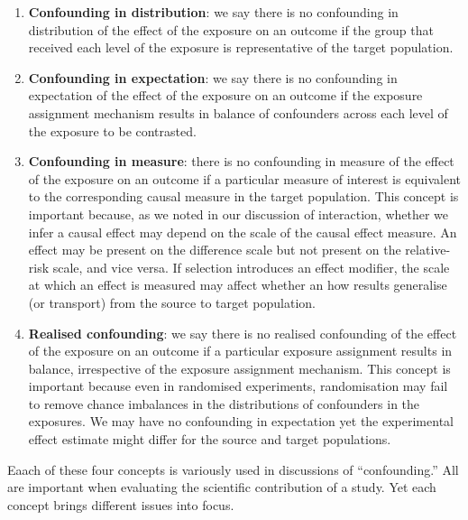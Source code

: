 \documentclass[
  singlecolumn]{report}
\begin{document}
\begin{enumerate}
\def\labelenumi{\arabic{enumi}.}
\item
  \textbf{Confounding in distribution}: we say there is no confounding
  in distribution of the effect of the exposure on an outcome if the
  group that received each level of the exposure is representative of
  the target population.
\item
  \textbf{Confounding in expectation}: we say there is no confounding in
  expectation of the effect of the exposure on an outcome if the
  exposure assignment mechanism results in balance of confounders across
  each level of the exposure to be contrasted.
\item
  \textbf{Confounding in measure}: there is no confounding in measure of
  the effect of the exposure on an outcome if a particular measure of
  interest is equivalent to the corresponding causal measure in the
  target population. This concept is important because, as we noted in
  our discussion of interaction, whether we infer a causal effect may
  depend on the scale of the causal effect measure. An effect may be
  present on the difference scale but not present on the relative-risk
  scale, and vice versa. If selection introduces an effect modifier, the
  scale at which an effect is measured may affect whether an how results
  generalise (or transport) from the source to target population.
\item
  \textbf{Realised confounding}: we say there is no realised confounding
  of the effect of the exposure on an outcome if a particular exposure
  assignment results in balance, irrespective of the exposure assignment
  mechanism. This concept is important because even in randomised
  experiments, randomisation may fail to remove chance imbalances in the
  distributions of confounders in the exposures. We may have no
  confounding in expectation yet the experimental effect estimate might
  differ for the source and target populations.
\end{enumerate}

Eaach of these four concepts is variously used in discussions of
``confounding.'' All are important when evaluating the scientific
contribution of a study. Yet each concept brings different issues into
focus.
\end{document}
